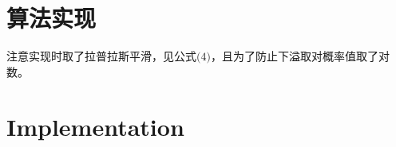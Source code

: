\documentclass{ctexart}
\begin{document}

\section{算法实现}
%
%
注意实现时取了拉普拉斯平滑，见公式$\big(4\big)$，且为了防止下溢取对概率值取了对数。\cite{mcmc:Liu}
%
\section{Implementation}
\end{document}
